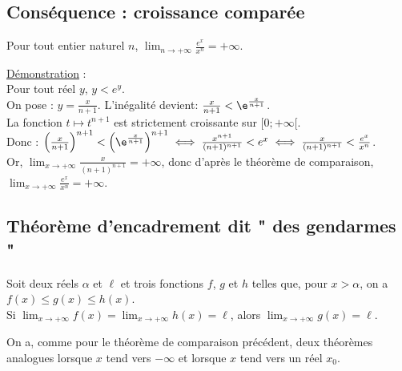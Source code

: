 \documentclass{cornouaille}
\begin{document}
\subsection{Conséquence : croissance comparée}
\begin{theoreme}
Pour tout entier naturel $n$, $\lim_{n\rightarrow +\infty} \frac{e^x}{x^n}=+\infty$.
\end{theoreme}

\underline{Démonstration} :\\

Pour tout réel $y$, $y<e^y$.\\
On pose : $y=\frac{x}{n+1}$. L'inégalité devient: $\frac{x}{n+1}<\e^{\frac{x}{n+1}}$.\\
La fonction $t \mapsto t^{n+1}$ est strictement croissante sur $[0 ; +\infty[$.\\
Donc : $\left(\frac{x}{n+1}\right)^{n+1}<\left(\e^{\frac{x}{n+1}}\right)^{n+1} \iff \frac{x^{n+1}}{(n+1)^{n+1}}<e^x \iff \frac{x}{(n+1)^{n+1}}<\frac{e^x}{x^n}$.\\
Or, $\lim_{x\rightarrow+\infty} \frac{x}{(n+1)^{n+1}}=+\infty$, donc d'après le théorème de comparaison, $\lim_{x\rightarrow+\infty} \frac{e^x}{x^n}=+\infty$.



\subsection{Théorème d'encadrement dit " des gendarmes "}

\begin{theoreme}
Soit deux réels $\alpha$ et $\ell$ et trois fonctions $f$, $g$ et $h$ telles que, pour $x>\alpha$, on a $f(x)\leqslant g(x)\leqslant h(x)$.\\
Si  $\lim_{x\rightarrow+\infty}f(x)=\lim_{x\rightarrow+\infty}h(x)=\ell$, alors $\lim_{x\rightarrow+\infty}g(x)=\ell$.
\end{theoreme}

\begin{remarque}
On a, comme pour le théorème de comparaison précédent,  deux théorèmes analogues lorsque $x$ tend vers $-\infty$ et lorsque $x$ tend vers un réel $x_0$.\\
\end{remarque}
\end{document}

